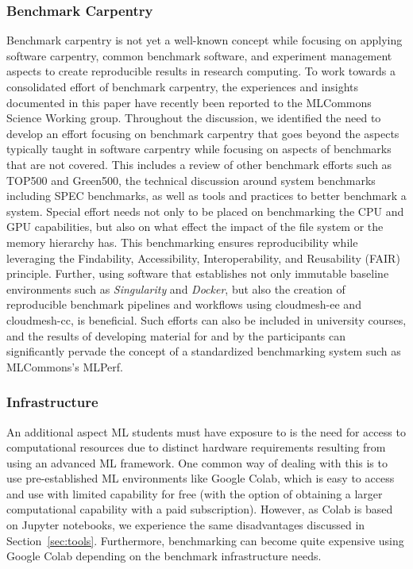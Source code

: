 \subsubsection{Benchmark Carpentry}

Benchmark carpentry is not yet a well-known concept while focusing on applying software carpentry, common benchmark software, and experiment management aspects to create reproducible results in research computing.  To work towards a consolidated effort of benchmark carpentry,  the experiences and insights documented in this paper have recently been reported to the MLCommons Science Working group. Throughout the discussion, we identified the need to develop an effort focusing on benchmark carpentry that goes beyond the aspects typically taught in software carpentry while focusing on aspects of benchmarks that are not covered. This includes a review of other benchmark efforts such as TOP500 and Green500, the technical discussion around system benchmarks including SPEC benchmarks, as well as tools and practices to better benchmark a system. Special effort needs not only to be placed on benchmarking the CPU and GPU capabilities, but also on what effect the impact of the file system or the memory hierarchy has. This benchmarking ensures reproducibility while leveraging the Findability, Accessibility, Interoperability, and Reusability (FAIR) principle. Further, using software that establishes not only immutable baseline environments such as {\em Singularity} and {\em Docker}, but also the creation of reproducible benchmark pipelines and workflows using cloudmesh-ee and cloudmesh-cc, is beneficial. Such efforts can also be included in university courses, and the results of developing material for and by the participants can significantly pervade the concept of a standardized benchmarking system such as MLCommons's MLPerf.

\subsubsection{Infrastructure}

An additional aspect ML students must have exposure to is the need for access to computational resources due to distinct hardware requirements resulting from using an advanced ML framework. One common way of dealing with this is to use pre-established ML environments like Google Colab, which is easy to access and use with limited capability for free (with the option of obtaining a larger computational capability with a paid subscription).  However, as Colab is based on Jupyter notebooks, we experience the same disadvantages discussed in Section~\ref{sec:tools}. Furthermore, benchmarking can become quite expensive using Google Colab depending on the benchmark infrastructure needs.

